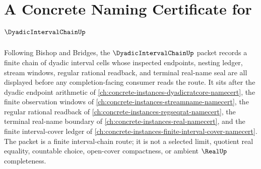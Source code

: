 \chapter{A Concrete Naming Certificate for $\DyadicIntervalChainUp$}
\label{ch:concrete-instances-dyadic-interval-chain-namecert}

Following Bishop and Bridges, the $\DyadicIntervalChainUp$ packet records a finite chain of dyadic interval cells whose inspected endpoints, nesting ledger, stream windows, regular rational readback, and terminal real-name seal are all displayed before any completion-facing consumer reads the route. It sits after the dyadic endpoint arithmetic of \autoref{ch:concrete-instances-dyadicratcore-namecert}, the finite observation windows of \autoref{ch:concrete-instances-streamname-namecert}, the regular rational readback of \autoref{ch:concrete-instances-regseqrat-namecert}, the terminal real-name boundary of \autoref{ch:concrete-instances-real-namecert}, and the finite interval-cover ledger of \autoref{ch:concrete-instances-finite-interval-cover-namecert}. The packet is a finite interval-chain route; it is not a selected limit, quotient real equality, countable choice, open-cover compactness, or ambient $\RealUp$ completeness.

